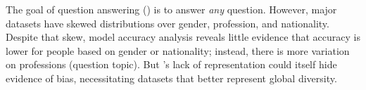 
The goal of question answering () is to answer \emph{any} question.
However, major  datasets have skewed distributions over gender, profession, and nationality.
Despite that skew, model accuracy analysis reveals little evidence that accuracy is lower for people based on gender or nationality; instead, there is more variation on professions (question topic).
But 's lack of representation could itself hide evidence of bias, necessitating  datasets that better represent global diversity.

